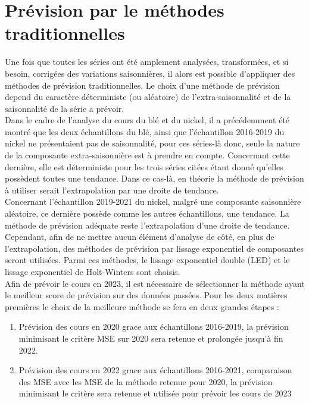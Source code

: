 \section{Prévision par le méthodes traditionnelles}\label{sec:tradi}
Une fois que toutes les séries ont été amplement analysées, transformées, et si besoin, corrigées des variations saisonnières, il alors est possible d'appliquer des 
méthodes de prévision traditionnelles. Le choix d'une méthode de prévision depend du caractère déterministe (ou aléatoire) de l'extra-saisonnalité et de la saisonnalité de
la série a prévoir. \\[11pt]
Dans le cadre de l'analyse du cours du blé et du nickel, il a précédemment été montré que les deux échantillons du blé, ainsi que l'échantillon 2016-2019 
du nickel ne présentaient pas de saisonnalité, pour ces séries-là donc, seule la nature de la composante extra-saisonnière est à prendre en compte. Concernant cette 
dernière, elle est déterministe pour les trois séries citées étant donné qu'elles possèdent toutes une tendance. Dans ce cas-là, en théorie la méthode de prévision à 
utiliser serait l'extrapolation par une droite de tendance.\\[11pt]
Concernant l'échantillon 2019-2021 du nickel, malgré une composante saisonnière aléatoire, ce dernière possède comme les autres échantillons, une tendance. La méthode de 
prévision adéquate reste l'extrapolation d'une droite de tendance.\\[11pt]
Cependant, afin de ne mettre aucun élément d'analyse de côté, en plus de l'extrapolation, des méthodes de prévision par lissage exponentiel de composantes seront 
utilisées. Parmi ces méthodes, le lissage exponentiel double (LED) et le lissage exponentiel de Holt-Winters sont choisis. \\[11pt]
Afin de prévoir le cours en 2023, il est nécessaire de sélectionner la méthode ayant le meilleur score de prévision sur des données passées. Pour les deux matières 
premières le choix de la meilleure méthode se fera en deux grandes étapes :
\begin{enumerate}
    \item Prévision des cours en 2020 grace aux échantillons 2016-2019, la prévision minimisant le critère MSE sur 2020 sera retenue et prolongée jusqu'à fin 2022.
    \item Prévision des cours en 2022 grace aux échantillons 2016-2021, comparaison des MSE avec les MSE de la méthode retenue pour 2020, la prévision minimisant le 
            critère sera retenue et utilisée pour prévoir les cours de 2023 
\end{enumerate}

